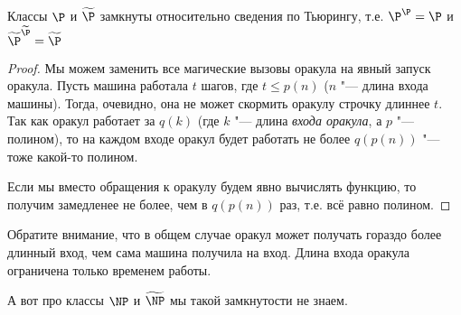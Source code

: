 	\begin{assertion}
		Классы $\P$ и $\widetilde{\P}$ замкнуты относительно сведения по Тьюрингу, т.е. $\P^{\P}=\P$ и $\widetilde\P^{\widetilde\P}=\widetilde\P$
	\end{assertion}
	\begin{proof}
		Мы можем заменить все магические вызовы оракула на явный запуск оракула.
		Пусть машина работала $t$ шагов, где $t \le p(n)$ ($n$ "--- длина входа машины).
		Тогда, очевидно, она не может скормить оракулу строчку длиннее $t$.
		Так как оракул работает за $q(k)$ (где $k$ "--- длина \textit{входа оракула}, а $p$ "--- полином),
		то на каждом входе оракул будет работать не более $q(p(n))$ "--- тоже какой-то полином.

		Если мы вместо обращения к оракулу будем явно вычислять функцию, то получим замедленее не более, чем в $q(p(n))$ раз,
		т.е. всё равно полином.
	\end{proof}
	\begin{Rem}
		Обратите внимание, что в общем случае оракул может получать гораздо более длинный вход, чем сама машина получила на вход.
		Длина входа оракула ограничена только временем работы.
	\end{Rem}
	\begin{Rem}
		А вот про классы $\NP$ и $\widetilde{\NP}$ мы такой замкнутости не знаем.
	\end{Rem}

